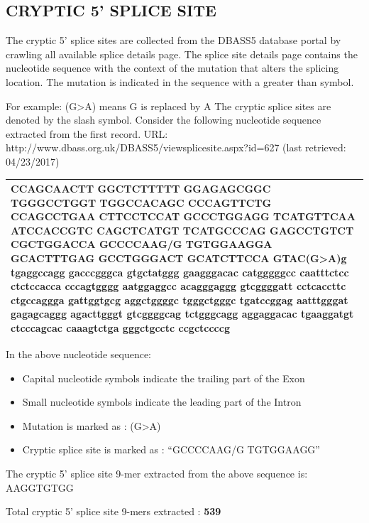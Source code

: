 \documentclass[12pt,a4paper]{article}
\begin{document}
	\subsection{CRYPTIC 5' SPLICE SITE}
	
	The cryptic 5’ splice sites are collected from the DBASS5 database portal \cite{dbass-0, dbass3} by crawling all available splice details page. The splice site details page contains the nucleotide sequence with the context of the mutation that alters the splicing location. The mutation is indicated in the sequence with a greater than symbol. \par
	For example: (G>A) means G is replaced by A \newline
	The cryptic splice sites are denoted by the slash symbol. \newline
	Consider the following nucleotide sequence extracted from the first record.\newline
	URL: http://www.dbass.org.uk/DBASS5/viewsplicesite.aspx?id=627 (last retrieved: 04/23/2017)

		
	\begin{tabular}{ | p{\linewidth} |}
		\hline
		CCAGCAACTT GGCTCTTTTT GGAGAGCGGC TGGGCCTGGT TGGCCACAGC CCCAGTTCTG CCAGCCTGAA CTTCCTCCAT GCCCTGGAGG TCATGTTCAA ATCCACCGTC CAGCTCATGT TCATGCCCAG GAGCCTGTCT CGCTGGACCA GCCCCAA\textbf{G/G} TGTGGAAGGA GCACTTTGAG GCCTGGGACT GCATCTTCCA GTAC\textbf{(G>A)}g tgaggccagg gacccgggca gtgctatggg gaagggacac catgggggcc caatttctcc ctctccacca cccagtgggg aatggaggcc acagggaggg gtcggggatt cctcaccttc ctgccaggga gattggtgcg aggctggggc tgggctgggc tgatccggag aatttgggat gagagcaggg agacttgggt gtcggggcag tctgggcagg aggaggacac tgaaggatgt ctcccagcac caaagtctga gggctgcctc ccgctccccg \\
		\hline
	\end{tabular}
	\newline
	\newline
	In the above nucleotide sequence:
	\begin{itemize}
		\item Capital nucleotide symbols indicate the trailing part of the Exon
		\item Small nucleotide symbols indicate the leading part of the Intron
		\item Mutation is marked as : (G>A)
		\item Cryptic splice site is marked as : “GCCCCAAG/G TGTGGAAGG”
	\end{itemize}
	The cryptic 5’ splice site 9-mer extracted from the above sequence is: AAGGTGTGG \par
	Total cryptic 5’ splice site 9-mers extracted : \textbf{539}
\end{document}

